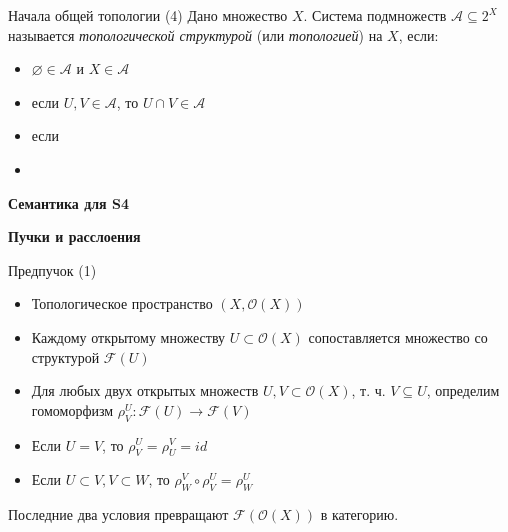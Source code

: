 \documentclass{beamer}
\begin{document}
\begin{frame}{Начала общей топологии (4)}
Дано множество $X$. Система подмножеств $\mathcal{A} \subseteq 2^X$ называется \textit{топологической структурой} (или \textit{топологией}) на $X$, если:\\
\bigskip
\begin{itemize}
	\item $\varnothing \in \mathcal{A}$ и $X \in \mathcal{A}$
	\item если $U, V \in \mathcal{A}$, то $U \cap V \in \mathcal{A}$
	\item если 
	\item 
\end{itemize}
\end{frame}


\begin{frame}{}
\begin{center}
	\textbf{Семантика для S4}
\end{center}
\end{frame}

\begin{frame}{}
\begin{center}
	\textbf{Пучки и расслоения}
\end{center}
\end{frame}

\begin{frame}{Предпучок (1)}
\begin{itemize}
	\item Топологическое пространство $(X, \mathcal{O}(X))$
	\item Каждому открытому множеству $U \subset \mathcal{O}(X)$ сопоставляется множество со структурой $\mathcal{F}(U)$
	\item Для любых двух открытых множеств $U, V \subset \mathcal{O}(X)$, т. ч. $V \subseteq U$, определим гомоморфизм $\rho^U_V : \mathcal{F}(U) \to \mathcal{F}(V)$
	\item Если $U = V$, то $\rho^U_V = \rho^V_U = id$
	\item Если $U \subset V, V \subset W$, то $\rho^V_W \circ \rho^U_V = \rho^U_W$
\end{itemize}
\bigskip
Последние два условия превращают $\mathcal{F}(\mathcal{O}(X))$ в категорию.
\end{frame}
\end{document}
